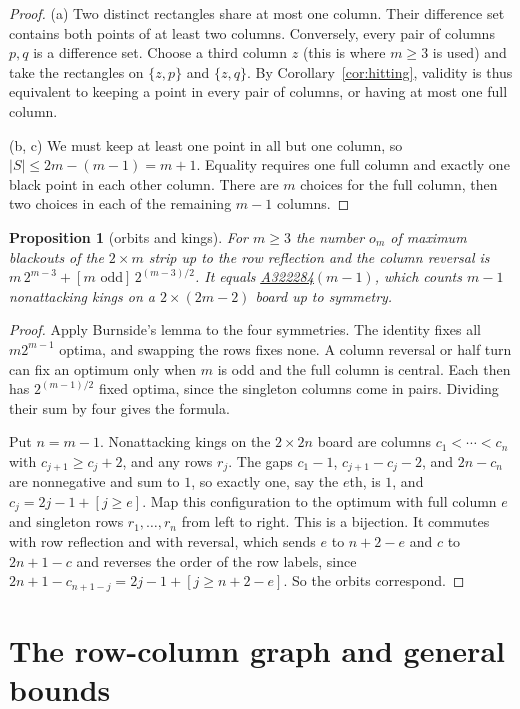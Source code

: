 \documentclass[12pt]{article}
\theoremstyle{plain}
\newtheorem{proposition}[theorem]{Proposition}
\theoremstyle{definition}
\theoremstyle{remark}
\newcommand{\seqnum}[1]{\href{https://oeis.org/#1}{\rm \underline{#1}}}
\begin{document}
\begin{proof}
(a) Two distinct rectangles share at most one column. Their difference
set contains both points of at least two columns. Conversely,
every pair of columns $p,q$ is a difference set. Choose a
third column $z$ (this is where $m\ge3$ is used) and take the rectangles on
$\{z,p\}$ and $\{z,q\}$. By Corollary~\ref{cor:hitting}, validity is thus
equivalent to keeping a point in every pair of columns, or having at most
one full column.

(b, c) We must keep at least one point in all but one column, so
$|S|\le2m-(m-1)=m+1$. Equality requires one full column and exactly one
black point in each other column. There are $m$ choices for the full
column, then two choices in each of the remaining $m-1$ columns.
\end{proof}

\begin{proposition}[orbits and kings]\label{prop:kings}
For $m\ge3$ the number $o_m$ of maximum blackouts of the $2\times m$ strip up to the row
reflection and the column reversal is $m\,2^{m-3}+[m\text{ odd}]\,2^{(m-3)/2}$. It equals
\seqnum{A322284}$(m-1)$, which counts $m-1$ nonattacking kings on a $2\times(2m-2)$
board up to symmetry.
\end{proposition}

\begin{proof}
Apply Burnside's lemma to the four symmetries. The identity fixes all
$m2^{m-1}$ optima, and swapping the rows fixes none. A column reversal or
half turn can fix an optimum only when $m$ is odd and the full column is
central. Each then has $2^{(m-1)/2}$ fixed optima, since the singleton
columns come in pairs. Dividing their sum by four gives the formula.

Put $n=m-1$. Nonattacking kings on the $2\times2n$ board are columns $c_1<\cdots<c_n$ with
$c_{j+1}\ge c_j+2$, and any rows $r_j$. The gaps $c_1-1$, $c_{j+1}-c_j-2$, and $2n-c_n$
are nonnegative and sum to $1$, so exactly one, say the $e$th, is $1$, and
$c_j=2j-1+[j\ge e]$. Map this configuration to the optimum with full column $e$ and singleton
rows $r_1,\ldots,r_n$ from left to right. This is a bijection. It commutes with row
reflection and with reversal, which sends $e$ to
$n+2-e$ and $c$ to $2n+1-c$ and reverses the order of the row labels, since $2n+1-c_{n+1-j}=2j-1+[j\ge n+2-e]$.
So the orbits correspond.
\end{proof}
\section{The row-column graph and general bounds}\label{sec:graph}
\end{document}
